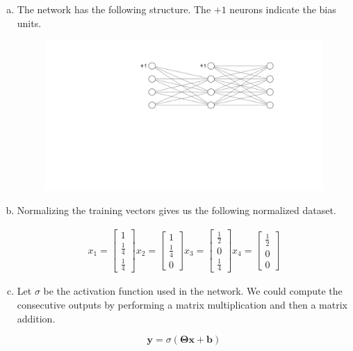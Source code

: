 \documentclass[a4paper, 10pt, twoside]{article}
\begin{document}
\begin{enumerate}[a)]
	\item The network has the following structure. The $+1$ neurons indicate the bias units.

	      \begin{figure}[h]
		      \includegraphics[width=0.8 \textwidth]{nn.png}
	      \end{figure}

	\item Normalizing the training vectors gives us the following normalized dataset.

	      \begin{align*}
		      x_1 = \begin{bmatrix}1 \\ \frac{1}{4} \\ \frac{1}{4}\end{bmatrix}
		      x_2 = \begin{bmatrix}1 \\ \frac{1}{4} \\ 0\end{bmatrix}
		      x_3 = \begin{bmatrix}\frac{1}{2} \\ 0 \\ \frac{1}{4}\end{bmatrix}
		      x_4 = \begin{bmatrix}\frac{1}{2} \\ 0 \\ 0\end{bmatrix}
	      \end{align*}

	\item
	      Let $\sigma$ be the activation function used in the network. We could compute the consecutive outputs by performing a matrix multiplication and then a matrix addition.

	      \[
		      \bm{y} = \sigma(\bm{\Theta}\bm{x} + \bm{b})
	      \]


\end{enumerate}
\end{document}
